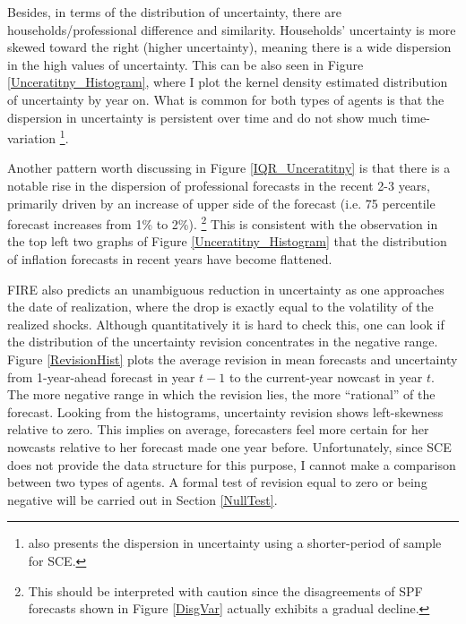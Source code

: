 \documentclass[12pt]{article}
\begin{document}
	
	Besides, in terms of the distribution of uncertainty, there are households/professional difference and similarity. Households' uncertainty is more skewed toward the right (higher uncertainty), meaning there is a wide dispersion in the high values of uncertainty. This can be also seen in Figure \ref{Unceratitny_Histogram}, where I plot the kernel density estimated distribution of uncertainty by year on. What is common for both types of agents is that the dispersion in uncertainty is persistent over time and do not show much time-variation \footnote{\citet{kumar2015inflation} also presents the dispersion in uncertainty using a shorter-period of sample for SCE.}.  
	
	Another pattern worth discussing in Figure \ref{IQR_Unceratitny} is that there is a notable rise in the dispersion of professional forecasts in the recent 2-3 years, primarily driven by an increase of upper side of the forecast (i.e. 75 percentile forecast increases from 1\% to 2\%). \footnote{This should be interpreted with caution since the disagreements of SPF forecasts shown in Figure \ref{DisgVar} actually exhibits a gradual decline. } This is consistent with the observation in the top left two graphs of Figure \ref{Unceratitny_Histogram} that the distribution of inflation forecasts in recent years have become flattened.
	
	FIRE also predicts an unambiguous reduction in uncertainty as one approaches the date of realization, where the drop is exactly equal to the volatility of the realized shocks. Although quantitatively it is hard to check this, one can look if the distribution of the uncertainty revision concentrates in the negative range. Figure \ref{RevisionHist} plots the average revision in mean forecasts and uncertainty from 1-year-ahead forecast in year $t-1$ to the current-year nowcast in year $t$. The more negative range in which the revision lies, the more ``rational'' of the forecast. Looking from the histograms, uncertainty revision shows left-skewness relative to zero. This implies on average,  forecasters feel more certain for her nowcasts relative to her forecast made one year before.  Unfortunately, since SCE does not provide the data structure for this purpose, I cannot make a comparison between two types of agents. A formal test of revision equal to zero or being negative will be carried out in Section \ref{NullTest}. 
	
\end{document}
